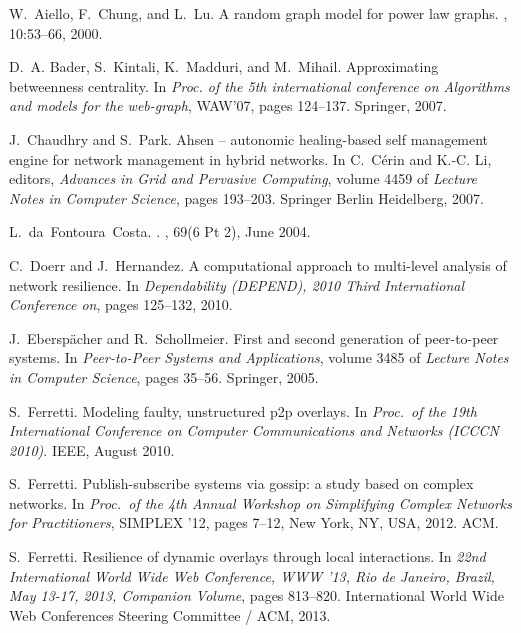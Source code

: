 \documentclass[10pt, conference, compsocconf]{IEEEtran}
\begin{document}

\begin{thebibliography}{10}

W.~Aiello, F.~Chung, and L.~Lu.
\newblock A random graph model for power law graphs.
, 10:53--66, 2000.

D.~A. Bader, S.~Kintali, K.~Madduri, and M.~Mihail.
\newblock Approximating betweenness centrality.
\newblock In {\em Proc. of the 5th international conference on Algorithms and
  models for the web-graph}, WAW'07, pages 124--137. Springer, 2007.

J.~Chaudhry and S.~Park.
\newblock Ahsen – autonomic healing-based self management engine for network
  management in hybrid networks.
\newblock In C.~Cérin and K.-C. Li, editors, {\em Advances in Grid and
  Pervasive Computing}, volume 4459 of {\em Lecture Notes in Computer Science},
  pages 193--203. Springer Berlin Heidelberg, 2007.

L.~da~Fontoura~Costa.
.
, 69(6 Pt 2), June 2004.

C.~Doerr and J.~Hernandez.
\newblock A computational approach to multi-level analysis of network
  resilience.
\newblock In {\em Dependability (DEPEND), 2010 Third International Conference
  on}, pages 125--132, 2010.

J.~Eberspächer and R.~Schollmeier.
\newblock First and second generation of peer-to-peer systems.
\newblock In {\em Peer-to-Peer Systems and Applications}, volume 3485 of {\em
  Lecture Notes in Computer Science}, pages 35--56. Springer, 2005.

S.~Ferretti.
\newblock Modeling faulty, unstructured p2p overlays.
\newblock In {\em Proc.~of the 19th International Conference on Computer
  Communications and Networks (ICCCN 2010)}. IEEE, August 2010.

S.~Ferretti.
\newblock Publish-subscribe systems via gossip: a study based on complex
  networks.
\newblock In {\em Proc.~of the 4th Annual Workshop on Simplifying Complex
  Networks for Practitioners}, SIMPLEX '12, pages 7--12, New York, NY, USA,
  2012. ACM.

S.~Ferretti.
\newblock Resilience of dynamic overlays through local interactions.
\newblock In {\em 22nd International World Wide Web Conference, WWW '13, Rio de
  Janeiro, Brazil, May 13-17, 2013, Companion Volume}, pages 813--820.
  International World Wide Web Conferences Steering Committee / ACM, 2013.


\end{thebibliography}
\end{document}
